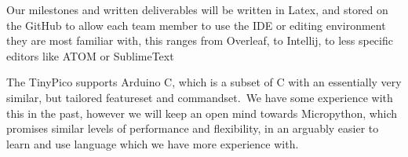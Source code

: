             Our milestones and written deliverables will be written in Latex, and stored on the GitHub to allow each
            team member to use the IDE or editing environment they are most familiar with, this ranges from Overleaf, to
            Intellij, to less specific editors like ATOM or SublimeText

            The TinyPico supports Arduino C, which is a subset of C with an essentially very similar, but tailored
            featureset and commandset.\ We have some experience with this in the past, however we will keep an open mind
            towards Micropython, which promises similar levels of performance and flexibility, in an arguably easier to
            learn and use language which we have more experience with.